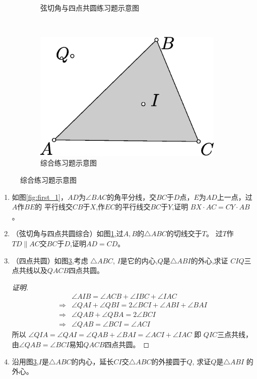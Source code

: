 \documentclass{article}
\begin{document}
\begin{enumerate}
\begin{figure}[!ht]
\begin{subfigure}[b]{0.31\textwidth}
    \caption{弦切角与四点共圆练习题示意图}\label{fig:first_2}
    \end{subfigure}~
    \begin{subfigure}[b]{0.31\textwidth}
    \includegraphics[width=\textwidth]{2018COP_G_P1.eps}
    \caption{综合练习题示意图}\label{fig:2018COP_G_P1}
    \end{subfigure}
    \end{figure}
\begin{enumerate}[label=(\arabic*)]
\item 如图\ref{fig:first_1}，$AD$为$\angle BAC$的角平分线，交$BC$于$D$点，$E$为$AD$上一点，过$A$作$BE$的
平行线交$CB$于$X$,作$EC$的平行线交$BC$于$Y$,证明 $BX\cdot AC=CY \cdot AB$。

\item （弦切角与四点共圆综合）如图\ref{fig:first_2},过$A,B$的$\triangle ABC$的切线交于$T$。
过$T$作$TD\parallel AC$交$BC$于$D$,证明$AD=CD$。


\item
（四点共圆）如图\ref{fig:2018COP_G_P1},考虑 $\triangle ABC$, $I$是它的内心,$Q$是$\triangle ABI$的外心,求证 $CIQ$三点共线以及$QACB$四点共圆。
\begin{proof}[证明]
\begin{align*}
&\angle AIB = \angle ACB + \angle IBC + \angle IAC \\
\Rightarrow & \angle QAI + \angle QBI = 2\angle BCI + \angle ABI + \angle BAI \\
\Rightarrow & \angle QAB + \angle QBA = 2\angle BCI \\
\Rightarrow & \angle QAB = \angle BCI = \angle ACI
\end{align*}
所以 $\angle QIA = \angle QAI = \angle QAB + \angle BAI= \angle ACI +\angle IAC$
即 $QIC$三点共线，由$\angle QAB = \angle BCI$易知$QACB$四点共圆。
\end{proof}
\item 
沿用图\ref{fig:2018COP_G_P1},$I$是$\triangle ABC$的内心，延长$CI$交$\triangle ABC$的外接圆于$Q$,
求证$Q$是$\triangle ABI$ 的外心。
\end{enumerate}
\end{enumerate}
\end{document}

